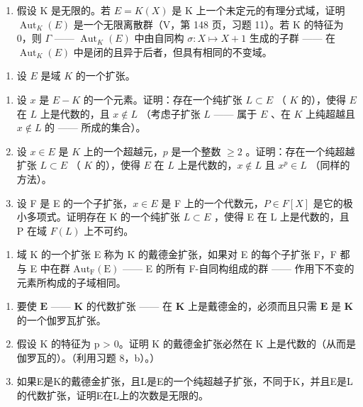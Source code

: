 \begin{enumerate}
\def\labelenumi{\alph{enumi})}
\setcounter{enumi}{4}
\tightlist
\item
  假设 K 是无限的。若 \(E = K(X)\) 是 K 上一个未定元的有理分式域，证明 \(\operatorname{Aut}_{K}(E)\) 是一个无限离散群（V，第 148 页，习题 11）。若 K 的特征为 0，则 \(\Gamma\) —— \(\operatorname{Aut}_{K}(E)\) 中由自同构 \(\sigma : X \mapsto X + 1\) 生成的子群 —— 在 \(\operatorname{Aut}_{K}(E)\) 中是闭的且异于后者，但具有相同的不变域。
\end{enumerate}

\begin{enumerate}
\def\labelenumi{\arabic{enumi})}
\setcounter{enumi}{7}
\tightlist
\item
  设 \(E\) 是域 \(K\) 的一个扩张。
\end{enumerate}

\begin{enumerate}
\def\labelenumi{\alph{enumi})}
\item
  设 \(x\) 是 \(E - K\) 的一个元素。证明：存在一个纯扩张 \(L \subset E\) （ \(K\) 的），使得 \(E\) 在 \(L\) 上是代数的，且 \(x \notin L\) （考虑子扩张 \(L\) —— 属于 \(E\) 、在 \(K\) 上纯超越且 \(x \notin L\) 的 —— 所成的集合）。
\item
  设 \(x \in E\) 是 \(K\) 上的一个超越元，\(p\) 是一个整数 \(\geqslant 2\) 。证明：存在一个纯超越扩张 \(L \subset E\) （ \(K\) 的），使得 \(E\) 在 \(L\) 上是代数的，\(x \notin L\) 且 \(x^p \in L\) （同样的方法）。
\item
  设 F 是 E 的一个子扩张，\(x \in E\) 是 F 上的一个代数元，\(P \in F[X]\) 是它的极小多项式。证明存在 K 的一个纯扩张 \(L \subset E\) ，使得 E 在 L 上是代数的，且 P 在域 \(F(L)\) 上不可约。
\end{enumerate}

\begin{enumerate}
\def\labelenumi{\arabic{enumi})}
\setcounter{enumi}{8}
\tightlist
\item
  域 K 的一个扩张 E 称为 K 的戴德金扩张，如果对 E 的每个子扩张 F，F 都与 E 中在群 \(\mathrm{Aut}_{\mathrm{F}}(\mathrm{E})\) —— E 的所有 F-自同构组成的群 —— 作用下不变的元素所构成的子域相同。
\end{enumerate}

\begin{enumerate}
\def\labelenumi{\alph{enumi})}
\item
  要使 \(\mathbf{E}\) —— \(\mathbf{K}\) 的代数扩张 —— 在 \(\mathbf{K}\) 上是戴德金的，必须而且只需 \(\mathbf{E}\) 是 \(\mathbf{K}\) 的一个伽罗瓦扩张。
\item
  假设 K 的特征为 p \textgreater{} 0。证明 K 的戴德金扩张必然在 K 上是代数的（从而是伽罗瓦的）。（利用习题 8，b）。）
\item
  如果E是K的戴德金扩张，且L是E的一个纯超越子扩张，不同于K，并且E是L的代数扩张，证明E在L上的次数是无限的。
\end{enumerate}

